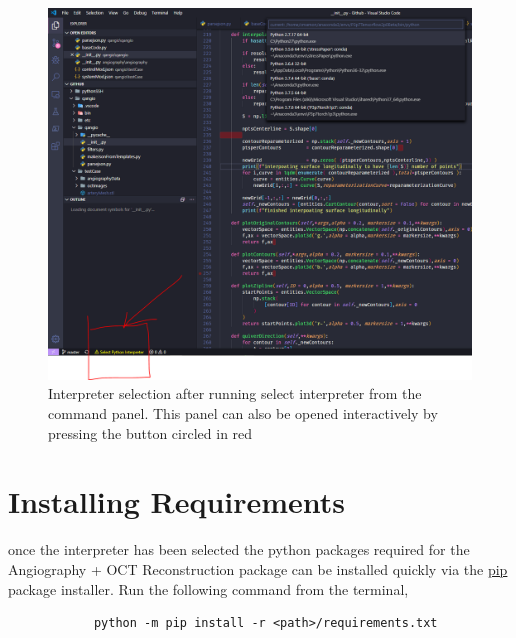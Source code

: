 \documentclass[10pt,a4paper]{article}
\begin{document}
		\begin{figure}[h!]
			\centering
			\includegraphics[scale=0.3]{figures/select_interpreter_b.PNG}
			\caption{Interpreter selection after running select interpreter from the command panel. This panel can also be opened interactively by pressing the button circled in red}
			\label{fig:interactiveSelectInterpreter}
		\end{figure}

		\newpage
	\section{Installing Requirements}
		once the interpreter has been selected the python packages required for the Angiography + OCT Reconstruction package can be installed quickly via the \href{https://pypi.org/project/pip/}{pip} package installer. Run the following command from the terminal,
		\begin{verbatim}
			python -m pip install -r <path>/requirements.txt
		\end{verbatim}
\end{document}
